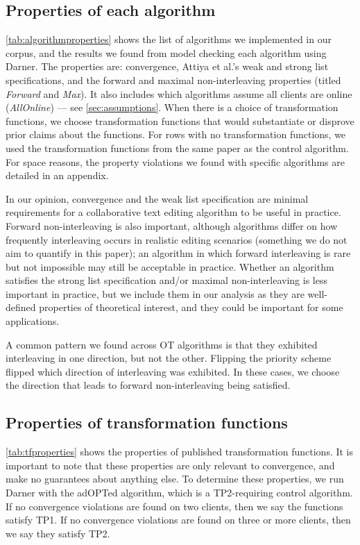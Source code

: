 \documentclass[sigplan,10pt,review,anonymous]{acmart}
\begin{document}
\subsection{Properties of each algorithm}

\autoref{tab:algorithmproperties} shows the list of algorithms we implemented in our corpus, and the results we found from model checking each algorithm using Darner.
The properties are: convergence, Attiya et al.'s weak and strong list specifications, and the forward and maximal non-interleaving properties (titled \emph{Forward} and \emph{Max}). It also includes which algorithms assume all clients are online (\emph{AllOnline}) --- see \autoref{sec:assumptions}. When there is a choice of transformation functions,
we choose transformation functions that would substantiate or disprove prior claims about the functions. For rows with no transformation functions, we used the transformation functions from the same paper as the control algorithm.
For space reasons, the property violations we found with specific algorithms are detailed in an appendix.

In our opinion, convergence and the weak list specification are minimal requirements for a collaborative text editing algorithm to be useful in practice.
Forward non-interleaving is also important, although algorithms differ on how frequently interleaving occurs in realistic editing scenarios (something we do not aim to quantify in this paper); an algorithm in which forward interleaving is rare but not impossible may still be acceptable in practice.
Whether an algorithm satisfies the strong list specification and/or maximal non-interleaving is less important in practice, but we include them in our analysis as they are well-defined properties of theoretical interest, and they could be important for some applications.

A common pattern we found across OT algorithms is that they exhibited interleaving in one direction, but not the other. Flipping the priority scheme flipped which direction of interleaving was exhibited. In these cases, we choose the direction that leads to forward non-interleaving being satisfied.

\subsection{Properties of transformation functions}

\autoref{tab:tfproperties} shows the properties of published transformation functions. It is important to note that these properties are only relevant to convergence, and make no guarantees about anything else. To determine these properties, we run Darner with the adOPTed algorithm, which is a TP2-requiring control algorithm. If no convergence violations are found on two clients, then we say the functions satisfy TP1. If no convergence violations are found on three or more clients, then we say they satisfy TP2. 
\end{document}
